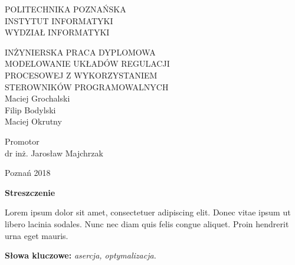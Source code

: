 \documentclass[a4paper,onecolumn,oneside,12pt]{mwrep}
\begin{document}
\begin{titlepage}
	\begin{center}
	\fontsize{14pt}{34pt}\selectfont
	POLITECHNIKA POZNAŃSKA \\
	\vspace*{.6\baselineskip}
	\fontsize{14pt}{14pt}\selectfont
	INSTYTUT INFORMATYKI\\WYDZIAŁ INFORMATYKI

	\vspace*{6\baselineskip}
	\fontsize{12pt}{14pt}\selectfont
	INŻYNIERSKA PRACA DYPLOMOWA \\

	\vspace*{1.15\baselineskip}
	\fontsize{18pt}{14pt}\selectfont
	MODELOWANIE UKŁADÓW REGULACJI\\PROCESOWEJ Z WYKORZYSTANIEM\\STEROWNIKÓW PROGRAMOWALNYCH \\	\vspace*{1.15\baselineskip}
	\fontsize{14pt}{14pt}\selectfont
	Maciej Grochalski\\Filip Bodylski\\Maciej Okrutny\\
	\end{center}

	\vspace*{8.5\baselineskip}
	\begin{flushright}
	\fontsize{12pt}{12pt}\selectfont
	Promotor\\
	dr inż. Jarosław Majchrzak\\
	\end{flushright}

	\vspace*{6\baselineskip}
	\begin{center}
	Poznań 2018
	\end{center}
\end{titlepage}

\begin{center}
\textbf{Streszczenie}
\end{center}

Lorem ipsum dolor sit amet, consectetuer adipiscing elit. Donec vitae ipsum ut
libero lacinia sodales. Nunc nec diam quis felis congue aliquet. Proin hendrerit
urna eget mauris.

\vspace*{\baselineskip}

\noindent\textbf{Słowa kluczowe:} \textit{asercja, optymalizacja.}
\end{document}
